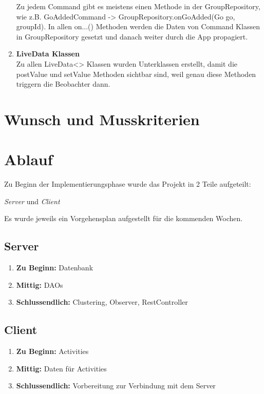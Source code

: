 \documentclass[11pt,a4paper]{scrartcl}
\begin{document}
\begin{enumerate}
Zu jedem Command gibt es meistens einen Methode in der GroupRepository, wie z.B. GoAddedCommand -> GroupRepository.onGoAdded(Go go, groupId). In allen on...() Methoden werden die Daten von Command Klassen in GroupRepository gesetzt und danach weiter durch die App propagiert.

\item \textbf{LiveData Klassen}\\

Zu allen LiveData<> Klassen wurden Unterklassen erstellt, damit die postValue und setValue Methoden sichtbar sind, weil genau diese Methoden triggern die Beobachter dann.
	
\end{enumerate}

\newpage

\section{Wunsch und Musskriterien}

\newpage

\section{Ablauf}

Zu Beginn der Implementierungsphase wurde das Projekt in 2 Teile aufgeteilt:

\textit{Server} und \textit{Client}

Es wurde jeweils ein Vorgehensplan aufgestellt für die kommenden Wochen.

\subsection{Server}

\begin{enumerate}
	\item \textbf{Zu Beginn:} Datenbank
	
	\item \textbf{Mittig:} DAOs
	
	\item \textbf{Schlussendlich:} Clustering, Observer, RestController
	
\end{enumerate}

\subsection{Client}
\begin{enumerate}
	\item \textbf{Zu Beginn:} Activities 

	\item \textbf{Mittig:} Daten für Activities

	\item \textbf{Schlussendlich:} Vorbereitung zur Verbindung mit dem Server
\end{enumerate}
\end{document}
